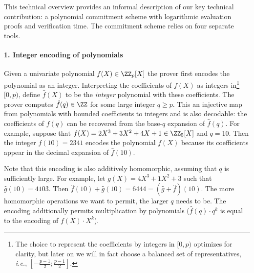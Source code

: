 This technical overview provides an informal description of our key technical contribution: a polynomial commitment scheme with logarithmic evaluation proofs and verification time.
The commitment scheme relies on four separate tools.
\paragraph{1. Integer encoding of polynomials}
Given a univariate polynomial $f(X)\in \ZZ_p[X]$ the prover first encodes the polynomial as an integer. Interpreting the coefficients of $f(X)$ as integers in\footnote{The choice to represent the coefficients by integers in $[0,p)$ optimizes for clarity, but later on we will in fact choose a balanced set of representatives, \emph{i.e.}, $[-\frac{p-1}{2}; \frac{p-1}{2}]$.} $[0, p)$, define $\hat{f}(X)$ to be the \emph{integer} polynomial with these coefficients. The prover computes $\hat{f}(q)\in \ZZ$ for some large integer $q\geq p$. This an injective map from polynomials with bounded coefficients to integers and is also decodable: the coefficients of $f(q)$ can be recovered from the base-$q$ expansion of $\hat{f}(q)$. For example, suppose that $f(X)=2X^3+3X^2+4X+1 \in \ZZ_5[X]$ and $q=10$. Then the integer $f(10)=2341$ encodes the polynomial $f(X)$ because its coefficients appear in the decimal expansion of $\hat{f}(10)$.

Note that this encoding is also additively homomorphic, assuming that $q$ is sufficiently large. 
For example, let $g(X)=4X^3+1X^2+3$ such that $\hat{g}(10)=4103$. Then $\hat{f}(10)+\hat{g}(10)=6444=(\hat{g}+\hat{f})(10)$. 
The more homomorphic operations we want to permit, the larger $q$ needs to be.
The encoding additionally permits multiplication by polynomials ($\hat{f}(q)\cdot q^k$ is equal to the encoding of $f(X)\cdot X^k$). 
\begin{comment}
Or in our example $100 \cdot f(10)=234100$ which is the encoding of $2\cdot X^5+3\cdot X^4+4\cdot X^3+X^2$.
\end{comment}

